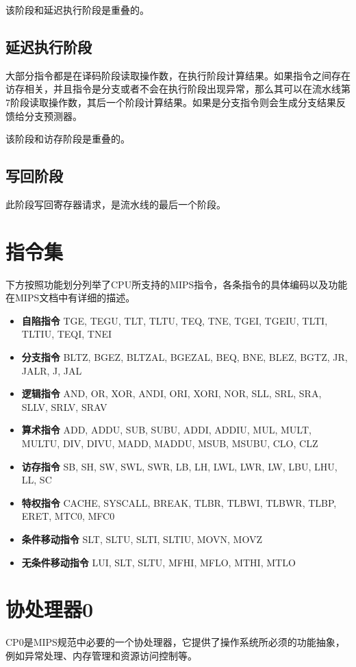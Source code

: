该阶段和延迟执行阶段是重叠的。

\subsection{延迟执行阶段}
大部分指令都是在译码阶段读取操作数，在执行阶段计算结果。如果指令之间存在访存相关，并且指令是分支或者不会在执行阶段出现异常，那么其可以在流水线第7阶段读取操作数，其后一个阶段计算结果。如果是分支指令则会生成分支结果反馈给分支预测器。

该阶段和访存阶段是重叠的。

\subsection{写回阶段}
此阶段写回寄存器请求，是流水线的最后一个阶段。
\section{指令集}
下方按照功能划分列举了CPU所支持的MIPS指令，各条指令的具体编码以及功能在MIPS文档中有详细的描述。
\begin{itemize}
	\item \textbf{自陷指令} TGE, TEGU, TLT, TLTU, TEQ, TNE, TGEI, TGEIU, TLTI, TLTIU, TEQI, TNEI
	\item \textbf{分支指令} BLTZ, BGEZ, BLTZAL, BGEZAL, BEQ, BNE, BLEZ, BGTZ, JR, JALR, J, JAL
	\item \textbf{逻辑指令} AND, OR, XOR, ANDI, ORI, XORI, NOR, SLL, SRL, SRA, SLLV, SRLV, SRAV
	\item \textbf{算术指令} ADD, ADDU, SUB, SUBU, ADDI, ADDIU, MUL, MULT, MULTU, DIV, DIVU, MADD, MADDU, MSUB, MSUBU, CLO, CLZ
	\item \textbf{访存指令} SB, SH, SW, SWL, SWR, LB, LH, LWL, LWR, LW, LBU, LHU, LL, SC
	\item \textbf{特权指令} CACHE, SYSCALL, BREAK, TLBR, TLBWI, TLBWR, TLBP, ERET, MTC0, MFC0
	\item \textbf{条件移动指令} SLT, SLTU, SLTI, SLTIU, MOVN, MOVZ
	\item \textbf{无条件移动指令} LUI, SLT, SLTU, MFHI, MFLO, MTHI, MTLO 
\end{itemize}

\section{协处理器0}
CP0是MIPS规范中必要的一个协处理器，它提供了操作系统所必须的功能抽象，例如异常处理、内存管理和资源访问控制等。

